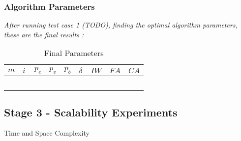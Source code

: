 \subsubsection{Algorithm Parameters}
\emph{\color{red} After running test case 1 (TODO), finding the optimal algorithm parameters, these are the final results :}

\begin{table}[H]
	\centering
    \begin{tabular}{|l|l|l|l|l|l|l|l|l|}
 	\hline
 	$m$ & $i$ & $p_{e}$ & $p_{v}$ & $p_{b}$ & $\delta$& $IW$ & $FA$ & $CA$  \\
 	\hline
    ~ & ~ & ~ & ~ & ~ & ~ & ~ & ~ & ~  \\
	\hline
    \end{tabular}
    \caption {Final Parameters}
    \label{table:finalParameters}
	\end{table}

\subsection{Stage 3 -  Scalability Experiments}
Time and Space Complexity
